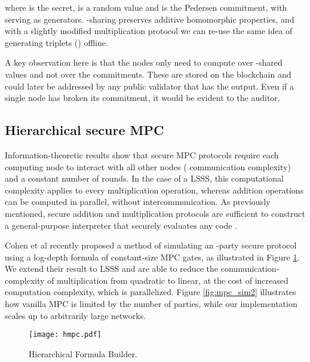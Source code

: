\documentclass{article} \usepackage{nips13submit_e,times}
\begin{document}
where  is the secret,  is a random value and  is the Pedersen commitment, with  serving as generators. -sharing preserves additive homomorphic properties, and with a slightly modified multiplication protocol we can re-use the same idea of generating triplets () offline.

A key observation here is that the nodes only need to compute over -shared values and not over the commitments. These are stored on the blockchain and could later be addressed by any public validator that has the output. Even if a single node has broken its commitment, it would be evident to the auditor.


















\subsection{Hierarchical secure MPC}
\label{sec:hmpc}

Information-theoretic results show that secure MPC protocols require each computing node to interact with all other nodes ( communication complexity) and a constant number of rounds. In the case of a LSSS, this computational complexity applies to every multiplication operation, whereas addition operations can be computed in parallel, without intercommunication. As previously mentioned, secure addition and multiplication protocols are sufficient to construct a general-purpose interpreter that securely evaluates any code \cite{GBW88}.

Cohen et al \cite{cohen13} recently proposed a method of simulating an -party secure protocol using a log-depth formula of constant-size MPC gates, as illustrated in Figure \ref{fig:builder2}. We extend their result to LSSS and are able to reduce the communication-complexity of multiplication from quadratic to linear, at the cost of increased computation complexity, which is parallelized. Figure \ref{fig:mpc_sim2} illustrates how vanilla MPC is limited by the number of parties, while our implementation scales up to arbitrarily large networks.



\begin{figure}[htbp]
\centering
\texttt{[image: hmpc.pdf]}
\caption{Hierarchical Formula Builder.}
\label{fig:builder2}
\end{figure}
\end{document}
